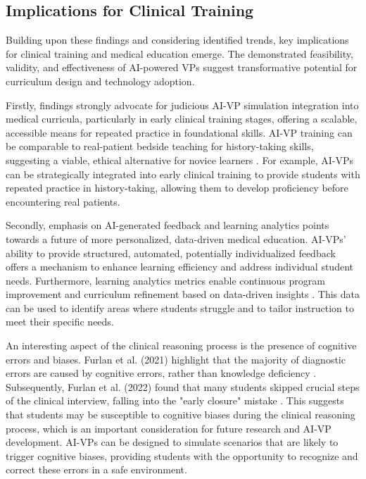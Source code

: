\subsection*{\textbf{Implications for Clinical Training}}

Building upon these findings and considering identified trends, key implications for clinical training and medical education emerge. The demonstrated feasibility, validity, and effectiveness of AI-powered VPs suggest transformative potential for curriculum design and technology adoption.

Firstly, findings strongly advocate for judicious AI-VP simulation integration into medical curricula, particularly in early clinical training stages, offering a scalable, accessible means for repeated practice in foundational skills. AI-VP training can be comparable to real-patient bedside teaching for history-taking skills, suggesting a viable, ethical alternative for novice learners \cite{co_using_2022}. For example, AI-VPs can be strategically integrated into early clinical training to provide students with repeated practice in history-taking, allowing them to develop proficiency before encountering real patients.

Secondly, emphasis on AI-generated feedback and learning analytics points towards a future of more personalized, data-driven medical education. AI-VPs' ability to provide structured, automated, potentially individualized feedback offers a mechanism to enhance learning efficiency and address individual student needs. Furthermore, learning analytics metrics enable continuous program improvement and curriculum refinement based on data-driven insights \cite{furlan_learning_2022}. This data can be used to identify areas where students struggle and to tailor instruction to meet their specific needs.

An interesting aspect of the clinical reasoning process is the presence of cognitive errors and biases. Furlan et al. (2021) highlight that the majority of diagnostic errors are caused by cognitive errors, rather than knowledge deficiency \cite{furlan_natural_2021}. Subsequently, Furlan et al. (2022) found that many students skipped crucial steps of the clinical interview, falling into the "early closure" mistake \cite{furlan_learning_2022}. This suggests that students may be susceptible to cognitive biases during the clinical reasoning process, which is an important consideration for future research and AI-VP development. AI-VPs can be designed to simulate scenarios that are likely to trigger cognitive biases, providing students with the opportunity to recognize and correct these errors in a safe environment.

